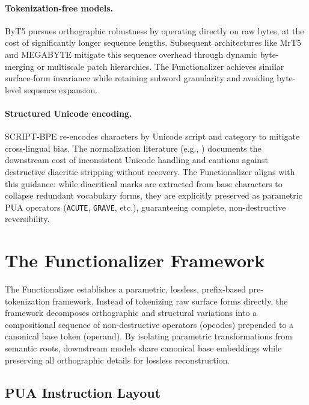 \documentclass{article}
\begin{document}
\paragraph{Tokenization-free models.} ByT5 \citep{xue2022} pursues orthographic robustness by operating directly on raw bytes, at the cost of significantly longer sequence lengths. Subsequent architectures like MrT5 \citep{kallini2025} and MEGABYTE \citep{yu2023} mitigate this sequence overhead through dynamic byte-merging or multiscale patch hierarchies. The Functionalizer achieves similar surface-form invariance while retaining subword granularity and avoiding byte-level sequence expansion.

\paragraph{Structured Unicode encoding.} SCRIPT-BPE \citep{land2025} re-encodes characters by Unicode script and category to mitigate cross-lingual bias. The normalization literature (e.g., \citealp{gorman2025}) documents the downstream cost of inconsistent Unicode handling and cautions against destructive diacritic stripping without recovery. The Functionalizer aligns with this guidance: while diacritical marks are extracted from base characters to collapse redundant vocabulary forms, they are explicitly preserved as parametric PUA operators (\texttt{ACUTE}, \texttt{GRAVE}, etc.), guaranteeing complete, non-destructive reversibility.

\section{The Functionalizer Framework}
\label{sec:framework}

The Functionalizer establishes a parametric, lossless, prefix-based pre-tokenization framework. Instead of tokenizing raw surface forms directly, the framework decomposes orthographic and structural variations into a compositional sequence of non-destructive operators (opcodes) prepended to a canonical base token (operand). By isolating parametric transformations from semantic roots, downstream models share canonical base embeddings while preserving all orthographic details for lossless reconstruction.

\subsection{PUA Instruction Layout}
\end{document}
